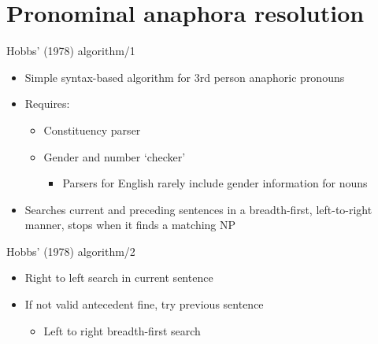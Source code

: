 \documentclass[dvipsnames, 10pt, compress]{beamer}
\begin{document}

\section{Pronominal anaphora resolution}




\begin{frame}{Hobbs' (1978) algorithm/1}

\begin{itemize}
  \item Simple syntax-based algorithm for 3rd person anaphoric pronouns
  \item Requires:
  \begin{itemize}
     \item Constituency parser
     \item Gender and number `checker'
     \begin{itemize}
        \item Parsers for English rarely include gender information for nouns
     \end{itemize}
  \end{itemize}
  \item Searches current and preceding sentences in a breadth-first, left-to-right
     manner, stops when it finds a matching NP
\end{itemize}

\end{frame}

\begin{frame}{Hobbs' (1978) algorithm/2}

\begin{itemize}
  \item Right to left search in current sentence 
  \item If not valid antecedent fine, try previous sentence
  \begin{itemize}
    \item Left to right breadth-first search
  \end{itemize}
 
\end{itemize}

\end{frame}
\end{document}
